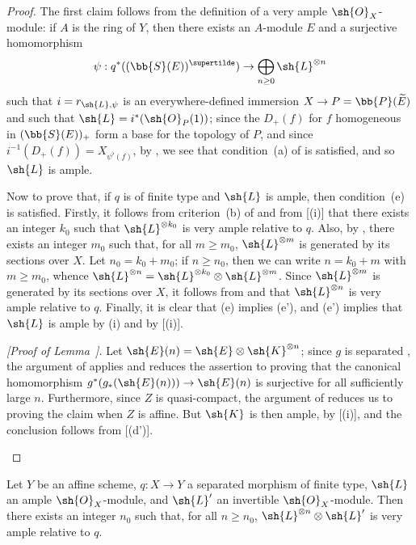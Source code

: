 \begin{proof}
The first claim follows from the definition  of a very ample $\sh{O}_X$-module: if $A$ is the ring of $Y$, then there exists an $A$-module $E$ and a surjective homomorphism
\[
  \psi: q^*((\bb{S}(E))^{\supertilde}) \to \bigoplus_{n\geq0}\sh{L}^{\otimes n}
\]
such that $i=r_{\sh{L},\psi}$ is an everywhere-defined immersion $X\to P=\bb{P}(\widetilde{E})$ and such that $\sh{L}=i^*(\sh{O}_P(1))$;
since the $D_+(f)$ for $f$ homogeneous in $(\bb{S}(E))_+$ form a base for the topology of $P$, and since $i^{-1}(D_+(f))=X_{\psi^\flat(f)}$, by , we see that condition~(a) of  is satisfied, and so $\sh{L}$ is ample.

Now to prove that, if $q$ is of finite type and $\sh{L}$ is ample, then condition~(e) is satisfied.
Firstly, it follows from criterion~(b) of  and from [(i)] that there exists
an integer $k_0$ such that $\sh{L}^{\otimes k_0}$ is very ample relative to $q$.
Also, by , there exists an integer $m_0$ such that, for all $m\geq m_0$, $\sh{L}^{\otimes m}$ is generated by its sections over $X$.
Let $n_0=k_0+m_0$;
if $n\geq n_0$, then we can write $n=k_0+m$ with $m\geq m_0$, whence $\sh{L}^{\otimes n}=\sh{L}^{\otimes k_0}\otimes\sh{L}^{\otimes m}$.
Since $\sh{L}^{\otimes m}$ is generated by its sections over $X$, it follows from  and  that $\sh{L}^{\otimes n}$ is very ample relative to $q$.
Finally, it is clear that (e) implies (e'), and (e') implies that $\sh{L}$ is ample by (i) and by [(i)].

  \begin{env}[4.5.10.1]
  \label{II.4.5.10.1}
  \emph{[Proof of Lemma~].}  
  Let $\sh{E}(n)=\sh{E}\otimes\sh{K}^{\otimes n}$;
  since $g$ is separated , the argument of  applies and reduces the assertion to proving that the canonical homomorphism $g^*(g_*(\sh{E}(n)))\to\sh{E}(n)$ is surjective for all sufficiently large $n$.
  Furthermore, since $Z$ is quasi-compact, the argument of  reduces us to proving the claim when $Z$ is affine.
  But $\sh{K}$ is then ample, by [(i)], and the conclusion follows from [(d')].
  \end{env}
\end{proof}

\begin{corollary}[4.5.11]
\label{II.4.5.11}
Let $Y$ be an affine scheme, $q:X\to Y$ a separated morphism of finite type, $\sh{L}$ an ample $\sh{O}_X$-module, and $\sh{L}'$ an invertible $\sh{O}_X$-module.
Then there exists an integer $n_0$ such that, for all $n\geq n_0$, $\sh{L}^{\otimes n}\otimes\sh{L}'$ is very ample relative to $q$.
\end{corollary}

